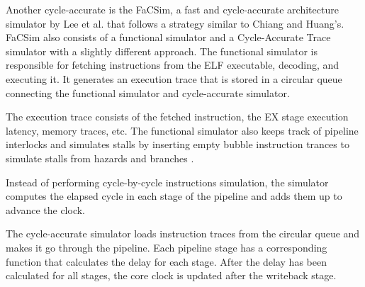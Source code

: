Another cycle-accurate is the FaCSim, a fast and cycle-accurate architecture simulator by Lee et al. that follows a strategy similar to Chiang and Huang's. FaCSim also consists of a functional simulator and a Cycle-Accurate Trace simulator with a slightly different approach. The functional simulator is responsible for fetching instructions from the ELF executable, decoding, and executing it. It generates an execution trace that is stored in a circular queue connecting the functional simulator and cycle-accurate simulator. \cite{leeFaCSimFastCycleAccurate2008}

The execution trace consists of the fetched instruction, the EX stage execution latency, memory traces, etc. The functional simulator also keeps track of pipeline interlocks and simulates stalls by inserting empty bubble instruction trances to simulate stalls from hazards and branches \cite{leeFaCSimFastCycleAccurate2008}.

Instead of performing cycle-by-cycle instructions simulation, the simulator computes the elapsed cycle in each stage of the pipeline and adds them up to advance the clock. 

The cycle-accurate simulator loads instruction traces from the circular queue and makes it go through the pipeline. Each pipeline stage has a corresponding function that calculates the delay for each stage. After the delay has been calculated for all stages, the core clock is updated after the writeback stage. 
\cite{leeFaCSimFastCycleAccurate2008}

